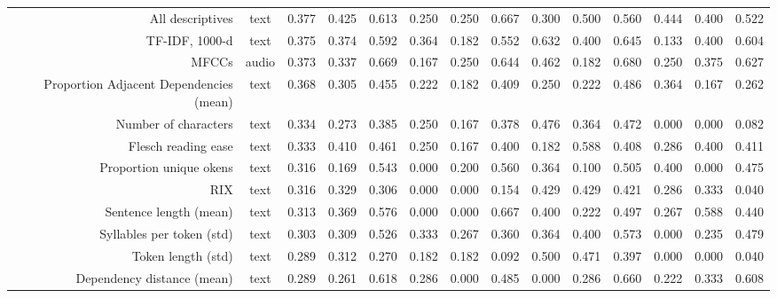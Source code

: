 \begin{tabular}{rc||ccc||ccc||ccc||ccc}
                       All descriptives &     text &              0.377 &      0.425 & 0.613 &    0.250 &      0.250 & 0.667 &     0.300 &      0.500 & 0.560 &     0.444 &      0.400 & 0.522 \\
                         TF-IDF, 1000-d &     text &              0.375 &      0.374 & 0.592 &    0.364 &      0.182 & 0.552 &     0.632 &      0.400 & 0.645 &     0.133 &      0.400 & 0.604 \\
                                  MFCCs &    audio &              0.373 &      0.337 & 0.669 &    0.167 &      0.250 & 0.644 &     0.462 &      0.182 & 0.680 &     0.250 &      0.375 & 0.627 \\
Proportion Adjacent Dependencies (mean) &     text &              0.368 &      0.305 & 0.455 &    0.222 &      0.182 & 0.409 &     0.250 &      0.222 & 0.486 &     0.364 &      0.167 & 0.262 \\
                   Number of characters &     text &              0.334 &      0.273 & 0.385 &    0.250 &      0.167 & 0.378 &     0.476 &      0.364 & 0.472 &     0.000 &      0.000 & 0.082 \\
                    Flesch reading ease &     text &              0.333 &      0.410 & 0.461 &    0.250 &      0.167 & 0.400 &     0.182 &      0.588 & 0.408 &     0.286 &      0.400 & 0.411 \\
                Proportion unique okens &     text &              0.316 &      0.169 & 0.543 &    0.000 &      0.200 & 0.560 &     0.364 &      0.100 & 0.505 &     0.400 &      0.000 & 0.475 \\
                                    RIX &     text &              0.316 &      0.329 & 0.306 &    0.000 &      0.000 & 0.154 &     0.429 &      0.429 & 0.421 &     0.286 &      0.333 & 0.040 \\
                 Sentence length (mean) &     text &              0.313 &      0.369 & 0.576 &    0.000 &      0.000 & 0.667 &     0.400 &      0.222 & 0.497 &     0.267 &      0.588 & 0.440 \\
              Syllables per token (std) &     text &              0.303 &      0.309 & 0.526 &    0.333 &      0.267 & 0.360 &     0.364 &      0.400 & 0.573 &     0.000 &      0.235 & 0.479 \\
                     Token length (std) &     text &              0.289 &      0.312 & 0.270 &    0.182 &      0.182 & 0.092 &     0.500 &      0.471 & 0.397 &     0.000 &      0.000 & 0.040 \\
             Dependency distance (mean) &     text &              0.289 &      0.261 & 0.618 &    0.286 &      0.000 & 0.485 &     0.000 &      0.286 & 0.660 &     0.222 &      0.333 & 0.608 \\

\end{tabular}

